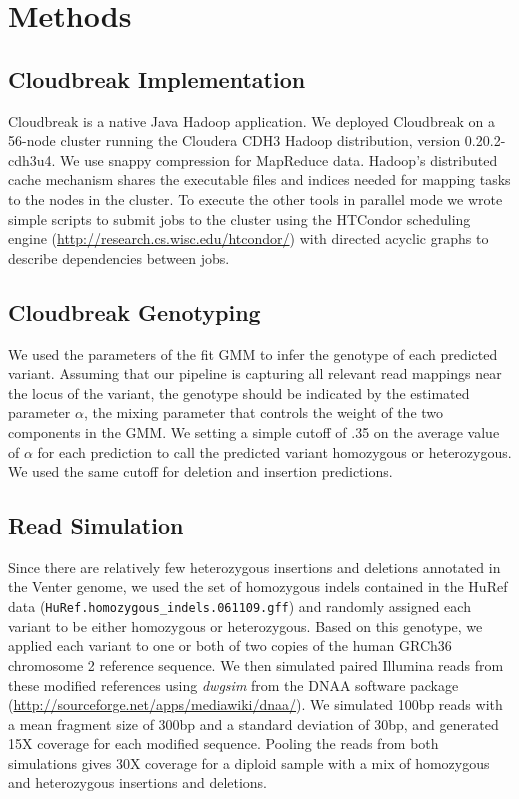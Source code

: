 \documentclass[11pt]{article}
\begin{document}
\newpage

\section{Methods}\label{discussion}

\subsection{Cloudbreak Implementation}
Cloudbreak is a native Java Hadoop application. We deployed Cloudbreak on a 56-node cluster running the Cloudera CDH3 Hadoop distribution, version 0.20.2-cdh3u4. We use snappy compression for MapReduce data. Hadoop's distributed cache mechanism shares the executable files and indices needed for mapping tasks to the nodes in the cluster. To execute the other tools in parallel mode we wrote simple scripts to submit jobs to the cluster using the HTCondor scheduling engine (\url{http://research.cs.wisc.edu/htcondor/}) with directed acyclic graphs to describe dependencies between jobs. 

\subsection{Cloudbreak Genotyping}
We used the parameters of the fit GMM to infer the genotype of each predicted variant. Assuming that our pipeline is capturing all relevant read mappings near the locus of the variant, the genotype should be indicated by the estimated parameter $\alpha$, the mixing parameter that controls the weight of the two components in the GMM. We setting a simple cutoff of .35 on the average value of $\alpha$ for each prediction to call the predicted variant homozygous or heterozygous. We used the same cutoff for deletion and insertion predictions.

\subsection{Read Simulation}
Since there are relatively few heterozygous insertions and deletions annotated in the Venter genome, we used the set of homozygous indels contained in the HuRef data (\texttt{HuRef.homozygous\_indels.061109.gff}) and randomly assigned each variant to be either homozygous or heterozygous. Based on this genotype, we applied each variant to one or both of two copies of the human GRCh36 chromosome 2 reference sequence. We then simulated paired Illumina reads from these modified references using \emph{dwgsim} from the DNAA software package (\url{http://sourceforge.net/apps/mediawiki/dnaa/}). We simulated 100bp reads with a mean fragment size of 300bp and a standard deviation of 30bp, and generated 15X coverage for each modified sequence. Pooling the reads from both simulations gives 30X coverage for a diploid sample with a mix of homozygous and heterozygous insertions and deletions.
\end{document}
